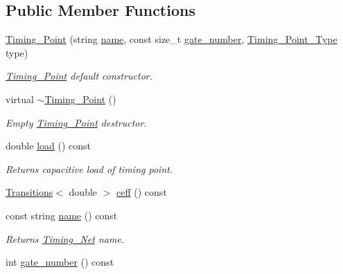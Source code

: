 \subsection*{Public Member Functions}
\begin{DoxyCompactItemize}
\item 
\hyperlink{classTiming__Analysis_1_1Timing__Point_a05b02a7c4e302a256b20bdabf79b37d1}{Timing\-\_\-\-Point} (string \hyperlink{classTiming__Analysis_1_1Timing__Point_aa4e767553f03fb8dea972d4443edc615}{name}, const size\-\_\-t \hyperlink{classTiming__Analysis_1_1Timing__Point_a9f8c6bbc7bc46a3d1ff81a984e76126f}{gate\-\_\-number}, \hyperlink{namespaceTiming__Analysis_a16a3b48fc06525858e635c3cde4d0ff9}{Timing\-\_\-\-Point\-\_\-\-Type} type)
\begin{DoxyCompactList}\small\item\em \hyperlink{classTiming__Analysis_1_1Timing__Point}{Timing\-\_\-\-Point} default constructor. \end{DoxyCompactList}\item 
virtual \hyperlink{classTiming__Analysis_1_1Timing__Point_a2c676cc95977d209cfa8fe0bcb40ec49}{$\sim$\-Timing\-\_\-\-Point} ()
\begin{DoxyCompactList}\small\item\em Empty \hyperlink{classTiming__Analysis_1_1Timing__Point}{Timing\-\_\-\-Point} destructor. \end{DoxyCompactList}\item 
double \hyperlink{classTiming__Analysis_1_1Timing__Point_aaca34298e068bdcc1655c50ee914b9f4}{load} () const 
\begin{DoxyCompactList}\small\item\em Returns capacitive load of timing point. \end{DoxyCompactList}\item 
\hyperlink{classTransitions}{Transitions}$<$ double $>$ \hyperlink{classTiming__Analysis_1_1Timing__Point_aa68be5e44a1d56f3e6c98dff1efe60e5}{ceff} () const 
\item 
const string \hyperlink{classTiming__Analysis_1_1Timing__Point_aa4e767553f03fb8dea972d4443edc615}{name} () const 
\begin{DoxyCompactList}\small\item\em Returns \hyperlink{classTiming__Analysis_1_1Timing__Net}{Timing\-\_\-\-Net} name. \end{DoxyCompactList}\item 
int \hyperlink{classTiming__Analysis_1_1Timing__Point_a9f8c6bbc7bc46a3d1ff81a984e76126f}{gate\-\_\-number} () const 

\end{DoxyCompactItemize}
